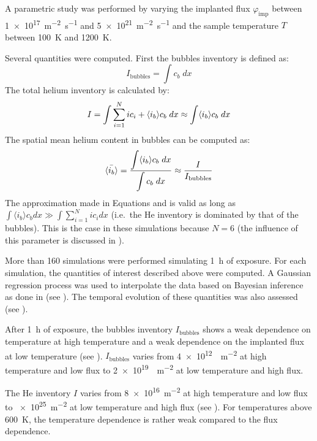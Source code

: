 A parametric study was performed by varying the implanted flux $\varphi_\mathrm{imp}$ between \SI{1e17}{m^{-2} s^{-1}} and \SI{5e21}{m^{-2} s^{-1}} and the sample temperature $T$ between \SI{100}{K} and \SI{1200}{K}.

Several quantities were computed.
First the bubbles inventory is defined as:
\begin{equation}
    I_\mathrm{bubbles}= \displaystyle \int c_b \; dx
\end{equation}
The total helium inventory is calculated by:
\begin{equation}
        I = \displaystyle \int \sum\limits_{i=1}^N i c_i + \langle i_b \rangle c_b \; dx
        \approx \displaystyle \int \langle i_b \rangle c_b \; dx
    \labeq{I}
\end{equation}
The spatial mean helium content in bubbles can be computed as:
\begin{equation}
        \Bar{\langle i_b \rangle} = \frac{\displaystyle \int \langle i_b \rangle c_b \; dx}{\displaystyle \int c_b \; dx}
        \approx \frac{I}{I_\mathrm{bubbles}}
    \labeq{mean ib}
\end{equation}
The approximation made in Equations  and  is valid as long as $\int \langle i_b \rangle c_b dx \gg  \int \sum\limits_{i=1}^N i c_i dx$ (i.e.\ the He inventory is dominated by that of the bubbles).
This is the case in these simulations because $N=6$ (the influence of this parameter is discussed in ).

More than 160 simulations were performed simulating \SI{1}{h} of exposure.
For each simulation, the quantities of interest described above were computed.
A Gaussian regression process  was used to interpolate the data based on Bayesian inference as done in  (see ).
The temporal evolution of these quantities was also assessed (see ).

After \SI{1}{h} of exposure, the bubbles inventory $I_\mathrm{bubbles}$ shows a weak dependence on temperature at high temperature and a weak dependence on the implanted flux at low temperature (see ).
$I_\mathrm{bubbles}$ varies from \SI{4e12}{ m^{-2}} at high temperature and low flux to \SI{2e19}{ m^{-2}} at low temperature and high flux.

The \gls{He} inventory $I$ varies from \SI{8e16}{m^{-2}} at high temperature and low flux to \SI{e25}{m^{-2}} at low temperature and high flux (see ).
For temperatures above \SI{600}{K}, the temperature dependence is rather weak compared to the flux dependence.

